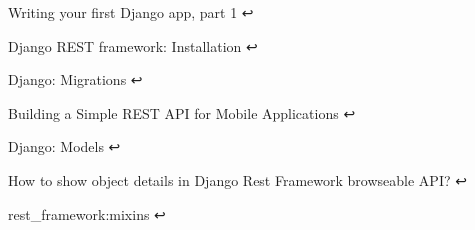 Writing your first Django app, part 1 ↩

Django REST framework: Installation ↩

Django: Migrations ↩

Building a Simple REST API for Mobile Applications ↩

Django: Models ↩

How to show object details in Django Rest Framework browseable API? ↩

rest_framework:mixins ↩